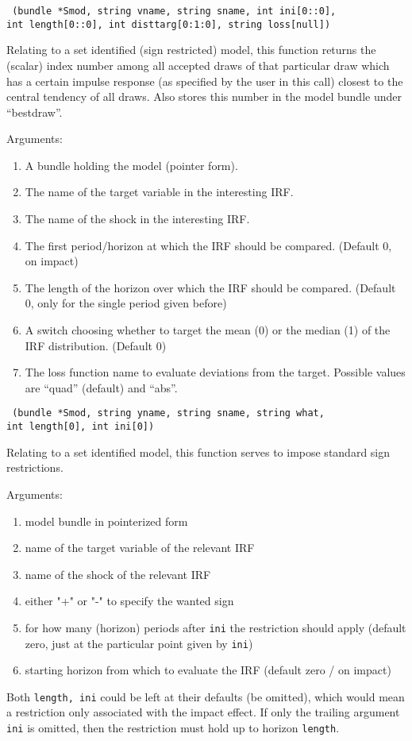 \documentclass[a4paper,10pt]{article}
\newenvironment{funcdoc}[1]
{\noindent\hrulefill\newline\nopagebreak\texttt{#1}%
\nopagebreak\par\noindent\hrulefill%
\nopagebreak\par\nopagebreak\smallskip\nopagebreak\par}
{\bigskip}
\begin{document}
\begin{funcdoc}{ (bundle *Smod, string vname, string sname,
    int ini[0::0], \\ int length[0::0],  int disttarg[0:1:0],  string loss[null]) }
  \noindent Relating to a set identified (sign restricted) model, this function returns
   the (scalar) index number among all accepted draws of that particular draw which has 
   a certain impulse response (as specified by the user in this call) closest to the central 
   tendency of all draws. Also stores this number in the model bundle under ``bestdraw''. 
   
  \noindent Arguments:
  \begin{enumerate}
  \item A bundle holding the model (pointer form).
  \item The name of the target variable in the interesting IRF.
  \item The name of the shock in the interesting IRF.
  \item The first period/horizon at which the IRF should be compared. (Default 0, on impact)
  \item The length of the horizon over which the IRF should be compared. (Default 0, only
  for the single period given before)
  \item A switch choosing whether to target the mean (0) or the median (1) of the IRF 
  distribution. (Default 0)
  \item The loss function name to evaluate deviations from the target. Possible values are
  ``quad'' (default) and ``abs''.
   \end{enumerate}  
\end{funcdoc}

\begin{funcdoc}{ (bundle *Smod, string yname, string sname, string what, \\
int length[0], int ini[0])}
\noindent Relating to a set identified model, this function serves to impose standard 
 sign restrictions.
 
 \noindent Arguments:
 
 \begin{enumerate}
 \item model bundle in pointerized form
 \item name of the target variable of the relevant IRF
 \item name of the shock of the relevant IRF
 \item either "+" or "-" to specify the wanted sign
 \item for how many (horizon) periods after \texttt{ini} the restriction should apply (default zero, 
   just at the particular point given by \texttt{ini})
 \item starting horizon from which to evaluate the IRF (default zero / on impact)
 \end{enumerate}
  Both \texttt{length, ini} could be left at their defaults 
  (be omitted), which would mean a restriction only associated with the impact effect. If only the 
  trailing argument \texttt{ini} is omitted, then the restriction must hold up to horizon \texttt{length}.
  \end{funcdoc}
\end{document}
